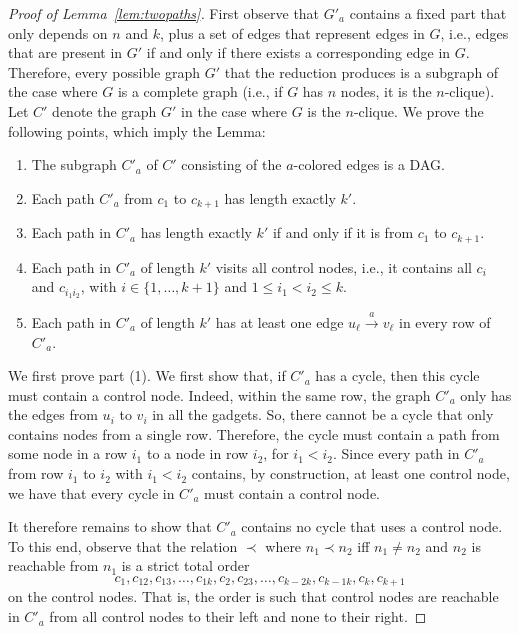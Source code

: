 \documentclass[a4paper,english]{lipics-v2016}
\theoremstyle{plain}
\begin{document}
\begin{proof}[Proof of Lemma~\ref{lem:twopaths}]
  First observe that $G'_a$ contains a fixed part that only depends on
  $n$ and $k$, plus a set of edges that represent edges in $G$, i.e.,
  edges that are present in $G'$ if and only if there exists a
  corresponding edge in $G$. Therefore, every possible graph $G'$
  that the reduction produces is a subgraph of the case where $G$ is
  a complete graph (i.e., if $G$ has $n$ nodes, it is the $n$-clique). Let $C'$ denote the graph $G'$ in the case where
  $G$ is the $n$-clique. We prove the following points, which imply
  the Lemma:
  \begin{enumerate}[(1)]
  \item The subgraph $C'_a$ of $C'$ consisting of the $a$-colored
    edges is a DAG.
  \item Each path $C'_a$ from $c_1$ to $c_{k+1}$ has length exactly $k'$.
  \item Each path in $C'_a$ has length exactly $k'$ if and only if it
    is from $c_1$ to $c_{k+1}$.
  \item Each path in $C'_a$ of length $k'$ visits all control
    nodes, i.e., it contains all $c_{i}$ and $c_{i_1i_2}$, with $i \in
    \{1,\ldots, k+1\}$ and $1\leq i_1<i_2 \leq k$. 
    \item Each path in $C'_a$ of length $k'$ has at least one edge $u_\ell\stackrel{a}{\to} v_\ell$ in every row of $C'_a$.
  \end{enumerate}

  We first prove part (1). We first show that, if $C'_a$ has a cycle,
  then this cycle must contain a control node. Indeed, within the same
  row, the graph $C'_a$ only has the edges from $u_i$ to $v_i$ in all
  the gadgets. So, there cannot be a cycle that only contains nodes
  from a single row. Therefore, the cycle must contain a path from
  some node in a row $i_1$ to a node in row $i_2$, for $i_1 <
  i_2$. Since every path in $C'_a$ from row $i_1$ to $i_2$
  with $i_1 < i_2$ contains, by construction, at least one control
  node, we have that every cycle in $C'_a$ must contain a control node.


  It therefore remains to show that $C'_a$ contains no cycle that uses
  a control node. To this end, observe that the relation $\prec$ where
  $n_1 \prec n_2$ iff $n_1 \neq n_2$ and $n_2$ is reachable from $n_1$ 
  is a strict total order
  \begin{equation}\label{eq:control-nodes-ordering}
    c_1, c_{12},c_{13},\ldots, c_{1k},c_2,c_{23},\ldots, c_{k-2k},
    c_{k-1k}, c_k, c_{k+1}
     \tag{$\dagger$} 
  \end{equation}
  on the control nodes. That is, the order is such that control nodes are reachable in $C'_a$
  from all control nodes to their left and none to their right.


\end{proof}
\end{document}
